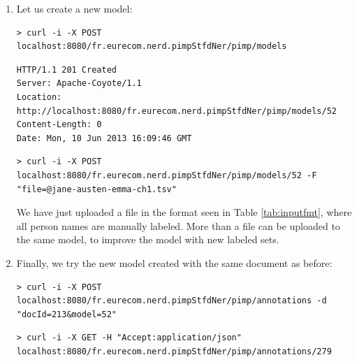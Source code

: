 \documentclass[a4paper,11pt]{report}
\newcommand{\shell}{\noindent\texttt}
\begin{document}
\begin{enumerate}
\begin{lstlisting}
> curl -i -X GET -H "Accept:application/json" localhost:8080/fr.eurecom.nerd.pimpStfdNer/pimp/annotations/278
\end{lstlisting}
\begin{lstlisting}
HTTP/1.1 200 OK
Server: Apache-Coyote/1.1
Content-Type: application/json
Transfer-Encoding: chunked
Date: Mon, 10 Jun 2013 15:24:33 GMT
\end{lstlisting}
\begin{lstlisting}[language=json]
{"token":[{"label":"O","word":"Emma"},{"label":"O","word":"and"},{"label":"PERSON","word":"Elizabeth"},{"label":"O","word":"shared"},{"label":"O","word":"a"},{"label":"O","word":"dream"},{"label":"O","word":"."}]}
\end{lstlisting}
We see that the default model does not correctly label "Emma", while Elizabeth is correctly tagged as \texttt{PERSON}.
\item Let us create a new model:
\begin{lstlisting}
> curl -i -X POST localhost:8080/fr.eurecom.nerd.pimpStfdNer/pimp/models
\end{lstlisting}
\begin{lstlisting}
HTTP/1.1 201 Created
Server: Apache-Coyote/1.1
Location: http://localhost:8080/fr.eurecom.nerd.pimpStfdNer/pimp/models/52
Content-Length: 0
Date: Mon, 10 Jun 2013 16:09:46 GMT
\end{lstlisting}
\begin{lstlisting}
> curl -i -X POST localhost:8080/fr.eurecom.nerd.pimpStfdNer/pimp/models/52 -F "file=@jane-austen-emma-ch1.tsv"
\end{lstlisting}
We have just uploaded a file in the format seen in Table \ref{tab:inputfmt}, where all person names are manually labeled. More than a file can be uploaded to the same model, to improve the model with new labeled sets.
\item Finally, we try the new model created with the same document as before:
\begin{lstlisting}
> curl -i -X POST localhost:8080/fr.eurecom.nerd.pimpStfdNer/pimp/annotations -d "docId=213&model=52"
\end{lstlisting}
\begin{lstlisting}
> curl -i -X GET -H "Accept:application/json" localhost:8080/fr.eurecom.nerd.pimpStfdNer/pimp/annotations/279
\end{lstlisting}

\end{enumerate}
\end{document}
